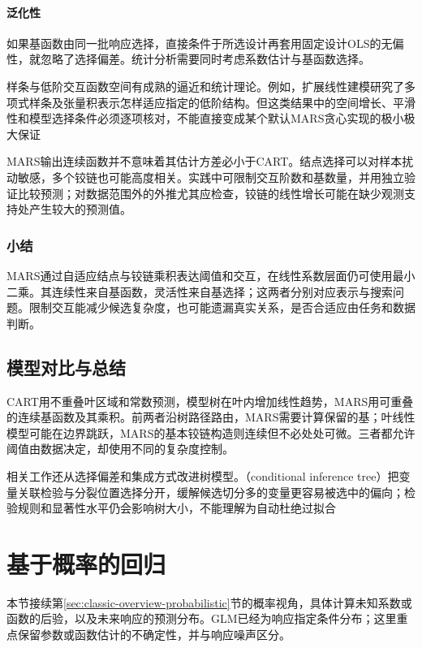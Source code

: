 \paragraph{泛化性}
如果基函数由同一批响应选择，直接条件于所选设计再套用固定设计OLS的无偏性，就忽略了选择偏差。统计分析需要同时考虑系数估计与基函数选择。

样条与低阶交互函数空间有成熟的逼近和统计理论。例如，扩展线性建模研究了多项式样条及张量积表示怎样适应指定的低阶结构。但这类结果中的空间增长、平滑性和模型选择条件必须逐项核对，不能直接变成某个默认MARS贪心实现的极小极大保证

MARS输出连续函数并不意味着其估计方差必小于CART。结点选择可以对样本扰动敏感，多个铰链也可能高度相关。实践中可限制交互阶数和基数量，并用独立验证比较预测；对数据范围外的外推尤其应检查，铰链的线性增长可能在缺少观测支持处产生较大的预测值。

\subsubsection{小结}

MARS通过自适应结点与铰链乘积表达阈值和交互，在线性系数层面仍可使用最小二乘。其连续性来自基函数，灵活性来自基选择；这两者分别对应表示与搜索问题。限制交互能减少候选复杂度，也可能遗漏真实关系，是否合适应由任务和数据判断。

\subsection{模型对比与总结}

CART用不重叠叶区域和常数预测，模型树在叶内增加线性趋势，MARS用可重叠的连续基函数及其乘积。前两者沿树路径路由，MARS需要计算保留的基；叶线性模型可能在边界跳跃，MARS的基本铰链构造则连续但不必处处可微。三者都允许阈值由数据决定，却使用不同的复杂度控制。

相关工作还从选择偏差和集成方式改进树模型。（conditional inference tree）把变量关联检验与分裂位置选择分开，缓解候选切分多的变量更容易被选中的偏向；检验规则和显著性水平仍会影响树大小，不能理解为自动杜绝过拟合

\section{基于概率的回归}
\label{sec:regression-probabilistic}

本节接续第\ref{sec:classic-overview-probabilistic}节的概率视角，具体计算未知系数或函数的后验，以及未来响应的预测分布。GLM已经为响应指定条件分布；这里重点保留参数或函数估计的不确定性，并与响应噪声区分。

